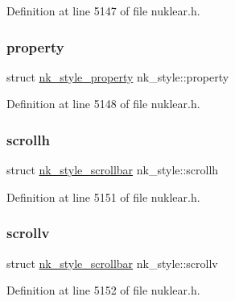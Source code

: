 Definition at line 5147 of file nuklear.\+h.

\mbox{\label{structnk__style_a6af2c48298dd1c358751c70c59b91924}} 
\subsubsection{\texorpdfstring{property}{property}}
{\footnotesize\ttfamily struct \mbox{\hyperlink{structnk__style__property}{nk\+\_\+style\+\_\+property}} nk\+\_\+style\+::property}



Definition at line 5148 of file nuklear.\+h.

\mbox{\label{structnk__style_a3ba589ca868f99b7dfcffce8e788c7a9}} 
\subsubsection{\texorpdfstring{scrollh}{scrollh}}
{\footnotesize\ttfamily struct \mbox{\hyperlink{structnk__style__scrollbar}{nk\+\_\+style\+\_\+scrollbar}} nk\+\_\+style\+::scrollh}



Definition at line 5151 of file nuklear.\+h.

\mbox{\label{structnk__style_a11ec083ec9db3bdb607dd9fb74eac901}} 
\subsubsection{\texorpdfstring{scrollv}{scrollv}}
{\footnotesize\ttfamily struct \mbox{\hyperlink{structnk__style__scrollbar}{nk\+\_\+style\+\_\+scrollbar}} nk\+\_\+style\+::scrollv}



Definition at line 5152 of file nuklear.\+h.

\mbox{\label{structnk__style_a7c05a97b375483b83cedf51932334357}} 
